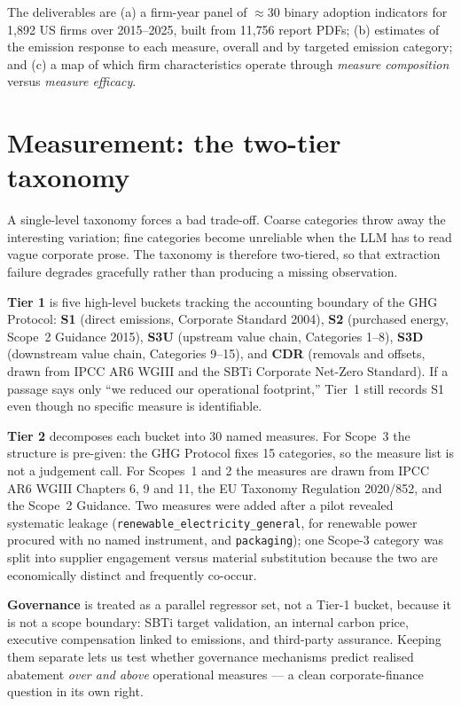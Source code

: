 \documentclass[11pt]{article}
\newcommand{\code}[1]{\texttt{\small #1}}
\begin{document}
The deliverables are (a) a firm-year panel of $\approx$30 binary adoption
indicators for 1{,}892 US firms over 2015--2025, built from 11{,}756 report
PDFs; (b) estimates of the emission response to each measure, overall and by
targeted emission category; and (c) a map of which firm characteristics
operate through \emph{measure composition} versus \emph{measure efficacy}.

\section{Measurement: the two-tier taxonomy}

A single-level taxonomy forces a bad trade-off. Coarse categories throw away
the interesting variation; fine categories become unreliable when the LLM has
to read vague corporate prose. The taxonomy is therefore two-tiered, so that
extraction failure degrades gracefully rather than producing a missing
observation.

\textbf{Tier 1} is five high-level buckets tracking the accounting boundary of
the GHG Protocol: \textbf{S1} (direct emissions, Corporate Standard 2004),
\textbf{S2} (purchased energy, Scope~2 Guidance 2015), \textbf{S3U} (upstream
value chain, Categories 1--8), \textbf{S3D} (downstream value chain,
Categories 9--15), and \textbf{CDR} (removals and offsets, drawn from IPCC AR6
WGIII and the SBTi Corporate Net-Zero Standard). If a passage says only
``we reduced our operational footprint,'' Tier~1 still records S1 even though
no specific measure is identifiable.

\textbf{Tier 2} decomposes each bucket into 30 named measures. For Scope~3 the
structure is pre-given: the GHG Protocol fixes 15 categories, so the measure
list is not a judgement call. For Scopes~1 and 2 the measures are drawn from
IPCC AR6 WGIII Chapters 6, 9 and 11, the EU Taxonomy Regulation 2020/852, and
the Scope~2 Guidance. Two measures were added after a pilot revealed
systematic leakage (\code{renewable\_electricity\_general}, for renewable
power procured with no named instrument, and \code{packaging}); one Scope-3
category was split into supplier engagement versus material substitution
because the two are economically distinct and frequently co-occur.

\textbf{Governance} is treated as a parallel regressor set, not a Tier-1
bucket, because it is not a scope boundary: SBTi target validation, an
internal carbon price, executive compensation linked to emissions, and
third-party assurance. Keeping them separate lets us test whether governance
mechanisms predict realised abatement \emph{over and above} operational
measures --- a clean corporate-finance question in its own right.
\end{document}
